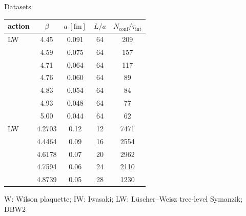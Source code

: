 \begin{block}{Datasets}
\begin{minipage}[t]{0.48\textwidth}
\begin{tabular}{lcccc}
        \toprule
        action & $\beta$ & $a\,[\mathrm{fm}]$ & $L/a$ & $N_\mathrm{conf}/\tau_\mathrm{int}$\\
        \midrule
        LW  & {\color{coolgreen} 4.45 }  & {\color{coolgreen} 0.091} & {\color{coolgreen} 64   } & {\color{coolgreen} 209  }  \\
            & {\color{coolgreen} 4.59 }  & {\color{coolgreen} 0.075} & {\color{coolgreen} 64   } & {\color{coolgreen} 157  }  \\
            & {\color{coolgreen} 4.71 }  & {\color{coolgreen} 0.064} & {\color{coolgreen} 64   } & {\color{coolgreen} 117  }  \\
            & {\color{coolgreen} 4.76 }  & {\color{coolgreen} 0.060} & {\color{coolgreen} 64   } & {\color{coolgreen} 89   }  \\
            & {\color{coolgreen} 4.83 }  & {\color{coolgreen} 0.054} & {\color{coolgreen} 64   } & {\color{coolgreen} 84   }  \\
            & {\color{coolgreen} 4.93 }  & {\color{coolgreen} 0.048} & {\color{coolgreen} 64   } & {\color{coolgreen} 77   }  \\
            & {\color{coolgreen} 5.00 }  & {\color{coolgreen} 0.044} & {\color{coolgreen} 64   } & {\color{coolgreen} 62   }  \\
        \midrule
        LW  & {\color{coolblue} 4.2703} & {\color{coolblue} 0.12  } & {\color{coolblue} 12    }& {\color{coolblue} 7471   } \\
            & {\color{coolblue} 4.4464} & {\color{coolblue} 0.09  } & {\color{coolblue} 16    }& {\color{coolblue} 2554   } \\
            & {\color{coolblue} 4.6178} & {\color{coolblue} 0.07  } & {\color{coolblue} 20    }& {\color{coolblue} 2962  } \\
            & {\color{coolblue} 4.7594} & {\color{coolblue} 0.06  } & {\color{coolblue} 24    }& {\color{coolblue} 2110  } \\
            & {\color{coolblue} 4.8739} & {\color{coolblue} 0.05  } & {\color{coolblue} 28    }& {\color{coolblue} 1230 } \\
        \bottomrule
        \end{tabular}

        \medskip
        \justifying
    \end{minipage}

    {\small W: Wilson plaquette; IW: Iwasaki; LW: L\"uscher--Weisz
    tree-level Symanzik; DBW2}

\end{block}

